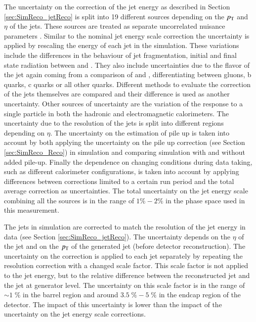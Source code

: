 The uncertainty on the correction of the jet energy as described in Section \ref{sec:SimReco_jetReco} is split into 19 different sources depending on the $p_{\mathrm{T}}$ and $\eta$ of the jets.
These sources are treated as separate uncorrelated nuisance parameters \cite{CMS-PAS-JME-16-003,Khachatryan:2016kdb}.
Similar to the nominal jet energy scale correction the uncertainty is applied by rescaling the energy of each jet in the simulation.
These variations include the differences in the behaviour of jet fragmentation, initial and final state radiation between  and \HERWIGPP \cite{Sjostrand:2006za,herwigpp}.
They also include uncertainties due to the flavor of the jet again coming from a comparison of  and \HERWIGPP, differentiating between gluons, b quarks, c quarks or all other quarks.
Different methods to evaluate the correction of the jets themselves are compared and their difference is used as another uncertainty.
Other sources of uncertainty are the variation of the response to a single particle in both the hadronic and electromagnetic calorimeters.
The uncertainty due to the resolution of the jets is split into different regions depending on $\eta$.
The uncertainty on the estimation of pile up is taken into account by both applying the uncertainty on the pile up correction (see Section \ref{sec:SimReco_Reco}) in simulation and comparing simulation with and without added pile-up.
Finally the dependence on changing conditions during data taking, such as different calorimeter configurations, is taken into account by applying differences between corrections limited to a certain run period and the total average correction as uncertainties.
The total uncertainty on the jet energy scale combining all the sources is in the range of $1 \%  - 2 \%$ in the phase space used in this measurement.

The jets in simulation are corrected to match the resolution of the jet energy in data (see Section \ref{sec:SimReco_jetReco}). The uncertainty depends on the $\eta$ of the jet and on
the $p_{\mathrm{T}}$ of the generated jet (before detector reconstruction). 
The uncertainty on the correction is applied to each jet separately by repeating the resolution correction with a changed scale factor.
This scale factor is not applied to the jet energy, but to the relative difference between the reconstructed jet and the jet at generator level.
The uncertainty on this scale factor is in the range of $\sim 1 \; \%$ in the barrel region and around $3.5 \; \% - 5 \; \%$ in the endcap region of the detector.
The impact of this uncertainty is lower than the impact 
of the uncertainty on the jet energy scale corrections.


